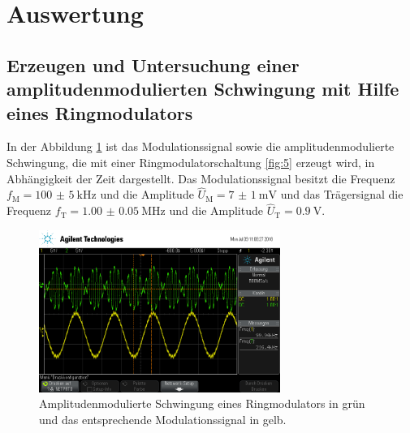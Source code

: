 \newpage
\section{Auswertung}
\label{sec:Auswertung}


\subsection{Erzeugen und Untersuchung einer amplitudenmodulierten Schwingung mit
Hilfe eines Ringmodulators}
\label{subsec:auswertung_a}
In der Abbildung \ref{fig:ringamp_zeit} ist das Modulationssignal
sowie die amplitudenmodulierte Schwingung, die mit einer Ringmodulatorschaltung \ref{fig:5}
erzeugt wird,
in Abhängigkeit der Zeit dargestellt.
Das Modulationssignal besitzt die Frequenz $f_{\text{M}}=\SI{100(5)}{\kilo\hertz}$ und die Amplitude
$\hat{U}_{\text{M}}=\SI{7(1)}{\milli\volt}$
und das Trägersignal die Frequenz
$f_{\text{T}}=\SI{1.00(5)}{\mega\hertz}$ und die Amplitude
$\hat{U}_{\text{T}}=\SI{0.9}{\volt}$.

\begin{figure}
  \centering
  \includegraphics[width=0.7\textwidth]{osci/amp_ringmodulator.png}
  \caption{Amplitudenmodulierte
  Schwingung eines Ringmodulators in grün und das entsprechende Modulationssignal in gelb.}
  \label{fig:ringamp_zeit}
\end{figure}

\FloatBarrier


